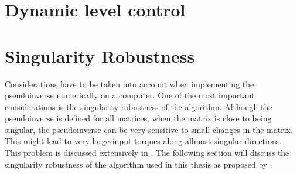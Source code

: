 \section{Dynamic level control}

\section{Singularity Robustness}

Considerations have to be taken into account when implementing the
pseudoinverse numerically on a computer. One of the most important considerations is the singularity
robustness of the algorithm. Although the pseudoinverse is defined for all matrices,
when the matrix is close to being singular, the pseudoinverse can be very sensitive
to small changes in the matrix. This might lead to very large input torques along
allmost-singular directions. This problem is discussed extensively in \cite{chiaverini1997}.
The following section will discuss the singularity robustness of the algorithm used in this
thesis as proposed by \cite{chiaverini1997}.

